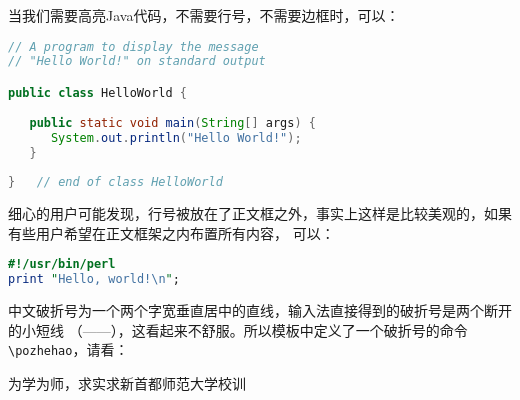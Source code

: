 当我们需要高亮Java代码，不需要行号，不需要边框时，可以：
\begin{lstlisting}[language=Java,numbers=none,frame=none]
// A program to display the message
// "Hello World!" on standard output

public class HelloWorld {
 
   public static void main(String[] args) {
      System.out.println("Hello World!");
   }
      
}   // end of class HelloWorld
\end{lstlisting}

细心的用户可能发现，行号被放在了正文框之外，事实上这样是比较美观的，如果有些用户希望在正文框架之内布置所有内容，
可以：
\begin{lstlisting}[language=perl,xleftmargin=2em,framexleftmargin=1.5em]
#!/usr/bin/perl
print "Hello, world!\n";
\end{lstlisting}

中文破折号为一个两个字宽垂直居中的直线，输入法直接得到的破折号是两个断开的小短线
（——），这看起来不舒服。所以模板中定义了一个破折号的命令 \verb|\pozhehao|，请看：


为学为师，求实求新\hfill \pozhehao{}首都师范大学校训

